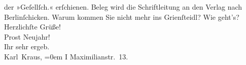 \begin{ledgroupsized}[t]{13cm}
                    der »Geſellſch.« erſchienen. Beleg wird die
                    Schriftleitung an den Verlag nach
                        Berlinſchicken. Warum kommen Sie nicht
                    mehr ins Grienſteidl? Wie geht’s?\pend
           \pstart
           Herzlichſte Grüße!{\\[\baselineskip]}Prost Neujahr!{\\[\baselineskip]}Ihr sehr ergeb.{\\[\baselineskip]}\spacefill\mbox{Karl
                        Kraus,}\pend
           \leftskip=0em{}\pstart
           \noindent{}I Maximilianstr. 13.\pend
                     \endnumbering{}\end{ledgroupsized}  \newcommand{\dateiname}{L00150}\newcommand{\titel}{Karl Kraus an Arthur Schnitzler, 31. 12. 1892}\newcommand{\editorInnen}{Martin Anton Müller und Gerd-Hermann Susen}
            \footnotesize
\begin{ledgroupsized}[t]{11.5cm}
\end{ledgroupsized}
         
      